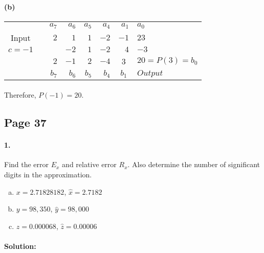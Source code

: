 \documentclass{article}  %
\begin{document}
            \paragraph{(b)}
            \renewcommand\tabcolsep{10.0pt} %
            \begin{threeparttable} %
                \begin{tabular}{rrrrrrrl} 
                 & & \(a_7\) & \(a_6\) & \(a_5\) & \(a_4\) & \(a_1\) & \(a_0\)\\ 
                \cline{1-1}
                \multicolumn{1}{c|}{Input} & & \(2\) & \(1\) & \(1\) & \(-2\) & \(-1\) & \(23\)\\ 
                \multicolumn{1}{c|}{\(c=-1\)} & & & \(-2\) & \(1\) & \(-2\) & \(4\) & \(-3\)\\
                \hline
                 & & \(2\) & \(-1\) & \(2\) & \(-4\) & \multicolumn{1}{c|}{3} & \(20 = P(3) = b_0\)\\
                 & & \(b_7\) & \(b_6\) & \(b_5\) & \(b_4\) & \multicolumn{1}{c|}{\(b_1\)} & \(Output\)\\
                \cline{8-8}
                \end{tabular} 
            \end{threeparttable}
            \paragraph{}Therefore, \(P(-1) = 20.\)

        \subsection*{Page 37} 
        \paragraph{1.}Find the error \(E_x\) and relative error \(R_x\). Also determine the number of significant digits in the approximation.
        \begin{enumerate}[(a)]
            \item \(x = 2.71828182\), \(\hat{x} = 2.7182\)
            \item \(y = 98,350\), \(\hat{y} = 98,000\)
            \item \(z = 0.000068\), \(\hat{z} = 0.00006\)
        \end{enumerate}
        \paragraph{Solution:}
\end{document}
